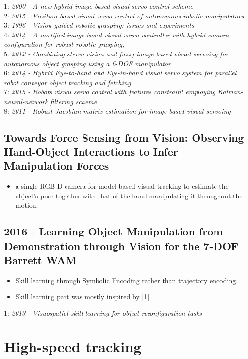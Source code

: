 1: \textit{2000 - A new hybrid image-based visual servo control scheme} \\
2: \textit{2015 - Position-based visual servo control of autonomous robotic manipulators} \\
3: \textit{1996 - Vision-guided robotic grasping: issues and experiments} \\
4: \textit{2014 - A modified image-based visual servo controller with hybrid camera configuration for robust robotic grasping,} \\
5: \textit{2012 - Combining stereo vision and fuzzy image based visual servoing for autonomous object grasping using a 6-DOF manipulator} \\
6: \textit{2014 - Hybrid Eye-to-hand and Eye-in-hand visual servo system for parallel robot conveyor object tracking and fetching} \\
7: \textit{2015 - Robots visual servo control with features constraint employing Kalman-neural-network filtering scheme} \\
8: \textit{2011 - Robust Jacobian matrix estimation for image-based
visual servoing}



\subsection{Towards Force Sensing from Vision: Observing Hand-Object Interactions to Infer Manipulation Forces}
\begin{itemize}
\item a single RGB-D camera for model-based visual
tracking to estimate the object's pose together with that
of the hand manipulating it throughout the motion. 
\end{itemize}

\subsection{2016 - Learning Object Manipulation from Demonstration through Vision for the 7-DOF Barrett WAM}
\begin{itemize}
\item Skill learning through Symbolic Encoding rather than trajectory encoding. 
\item Skill learning part was mostly inspired by [1]
\end{itemize}
1: \textit{2013 - Visuospatial skill learning for object reconfiguration
tasks}

\section{High-speed tracking}
